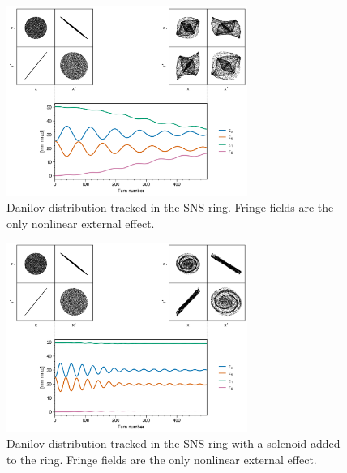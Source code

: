 \begin{figure}[!p]
    \centering
    \includegraphics[width=0.7\textwidth]{Images/chapter3/fringe.png}
    \caption{Danilov distribution tracked in the SNS ring. Fringe fields are the only nonlinear external effect.}
    \label{fig:fringe_a}
    \vspace*{3cm}
\end{figure}

\begin{figure}[!p]
    \centering
    \includegraphics[width=0.7\textwidth]{Images/chapter3/fringe_solenoid.png}
    \caption{Danilov distribution tracked in the SNS ring with a solenoid added to the ring. Fringe fields are the only nonlinear external effect.}
    \label{fig:fringe_b}
    \vspace*{3cm}
\end{figure}

